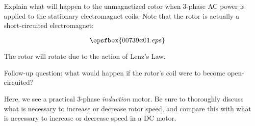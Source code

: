 

Explain what will happen to the unmagnetized rotor when 3-phase AC power is applied to the stationary electromagnet coils.  Note that the rotor is actually a short-circuited electromagnet:

$$\epsfbox{00739x01.eps}$$







The rotor will rotate due to the action of Lenz's Law.

\vskip 10pt

Follow-up question: what would happen if the rotor's coil were to become open-circuited?







Here, we see a practical 3-phase {\it induction} motor.  Be sure to thoroughly discuss what is necessary to increase or decrease rotor speed, and compare this with what is necessary to increase or decrease speed in a DC motor.




